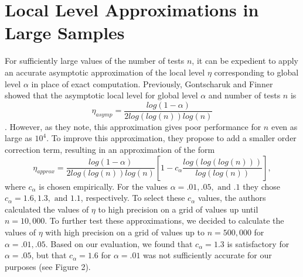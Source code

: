\documentclass[article]{jss}
\begin{document}
\section{Local Level Approximations in Large Samples}
\label{sec:approx}
For sufficiently large values of the number of tests $n$, it can be expedient to apply an accurate asymptotic approximation of the local level $\eta$ corresponding to global level $\alpha$ in place of exact computation. Previously, Gontscharuk and Finner showed that the asymptotic local level for global level $\alpha$ and number of tests $n$ is
%
\begin{equation*}
    \eta_{asymp} = \frac{log(1 - \alpha)}{2log(log(n))log(n)}
\end{equation*}
%
\citep{gontscharuk2017asymptotics}. However, as they note, this approximation gives poor performance for $n$ even as large as $10^{4}$. To improve this approximation, they propose to add a smaller order correction term, resulting in an approximation of the form
%
\begin{equation}
    \eta_{approx} = \frac{log(1 - \alpha)}{2log(log(n))log(n)}\left[1 - c_{\alpha}\frac{log(log(log(n)))}{log(log(n))}\right],
\end{equation}
%
where $c_{\alpha}$ is chosen empirically. For the values $\alpha = .01, .05, \textrm{ and } .1$ they chose $c_{\alpha} = 1.6, 1.3, \textrm{ and } 1.1$, respectively. To select these $c_{\alpha}$ values, the authors calculated the values of $\eta$ to high precision on a grid of values up until $n = 10,000$. To further test these approximations, we decided to calculate the values of $\eta$ with high precision on a grid of values up to $n = 500,000$ for $\alpha = .01, .05$. Based on our evaluation, we found that $c_{\alpha} = 1.3$ is satisfactory for $\alpha = .05$, but that $c_{\alpha} = 1.6$ for $\alpha = .01$ was not sufficiently accurate for our purposes (see Figure 2).
\end{document}
